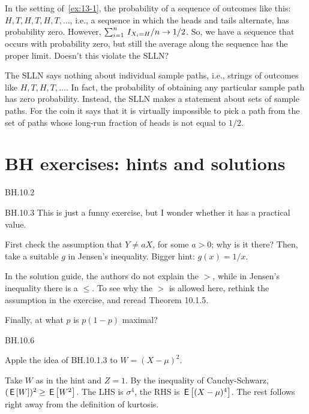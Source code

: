 \begin{exercise}
In the setting of~\cref{ex:13-1}, the probability of a sequence of outcomes like this: $H, T, H, T, H, T,\ldots$, i.e., a sequence in which the heads and tails alternate, has probability zero. However, $\sum_{i=1}^{n}\,I_{X_{i}=H}/n \to 1/2$. So, we have a sequence that occurs with probability zero, but still the average along the sequence has the proper limit. Doesn't this violate the SLLN?
\begin{solution}
The SLLN says nothing about individual sample paths, i.e.,  strings of outcomes like $H, T, H, T, \ldots$. In fact, the probability of obtaining any particular sample path has zero probability. Instead, the SLLN makes a statement about sets of sample paths. For the coin it says that it is virtually impossible to pick a path from the set of paths whose  long-run fraction of heads is not equal to $1/2$.
\end{solution}
\end{exercise}


\section{BH exercises: hints and solutions}

\begin{exercise}
BH.10.2
\end{exercise}

\begin{exercise}
BH.10.3
This is just a funny exercise, but I wonder whether it has a practical value.
\begin{hint}
First check the assumption that $Y\neq a X$, for some $a>0$; why is it there?
Then, take a suitable $g$ in Jensen's inequality.
Bigger hint: $g(x)=1/x$.

In the solution guide, the authors do not explain the $>$, while in Jensen's inequality there is a $\leq$. To see why the $>$ is allowed here, rethink the assumption in the exercise, and reread Theorem 10.1.5.

Finally, at what $p$ is $p(1-p)$ maximal?
\end{hint}
\end{exercise}

\begin{exercise}
BH.10.6
\begin{hint}
Apple the idea of BH.10.1.3 to $W=(X-\mu)^2$.
\end{hint}
\begin{solution}
Take $W$ as in the hint and $Z=1$. By the inequality of Cauchy-Schwarz, $(\,\mathsf{E}\left[W\right])^2 \geq \,\mathsf{E}\left[W^2\right]$. The LHS is $\sigma^{4}$, the RHS is $\,\mathsf{E}\left[(X-\mu)^4\right]$. The rest  follows right away from the definition of kurtosis.
\end{solution}
\end{exercise}

